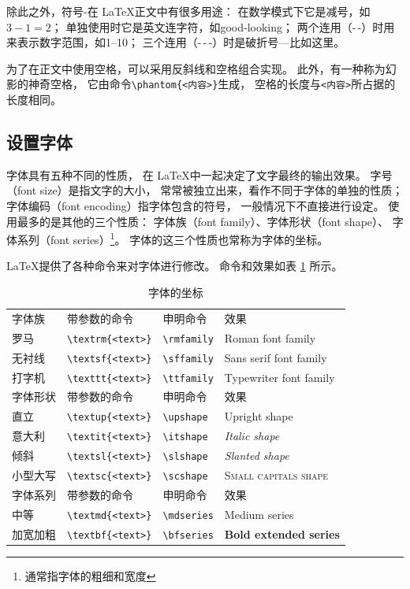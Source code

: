 \documentclass{ctexart}
\numberwithin{equation}{section}			%
\begin{document}
	除此之外，符号-在 \LaTeX 正文中有很多用途：
	在数学模式下它是减号，如$3-1=2$；
	单独使用时它是英文连字符，如good-looking；
	两个连用（-\,-）时用来表示数字范围，如1--10；
	三个连用（-\,-\,-）时是破折号---比如这里。
	
	为了在正文中使用空格，可以采用反斜线和空格组合实现。
	此外，有一种称为幻影的神奇空格，
	它由命令\verb|\phantom{<内容>}|生成，
	空格的长度与\verb|<内容>|所占据的长度相同。
	
	\subsection{设置字体}
	字体具有五种不同的性质，
	在 \LaTeX 中一起决定了文字最终的输出效果。
	字号（font size）是指文字的大小，
	常常被独立出来，看作不同于字体的单独的性质；
	字体编码（font encoding）指字体包含的符号，
	一般情况下不直接进行设定。
	使用最多的是其他的三个性质：
	字体族（font family）、字体形状（font shape）、
	字体系列（font series）\footnote{通常指字体的粗细和宽度}。
	字体的这三个性质也常称为字体的坐标。
	
	\LaTeX 提供了各种命令来对字体进行修改。
	命令和效果如表 \ref{tab:fontcoord} 所示。
	
	\begin{table}[hbp]
		\centering
		\caption{字体的坐标}
		\label{tab:fontcoord}
		\begin{tabular}{llll}
			\toprule
			字体族 & 带参数的命令 & 申明命令 & 效果 \\
			罗马 & \verb|\textrm{<text>}| & \verb|\rmfamily|
			    & \rmfamily Roman font family \\
			无衬线 & \verb|\textsf{<text>}| & \verb|\sffamily|
			    & \sffamily Sans serif font family \\
			打字机 & \verb|\texttt{<text>}| & \verb|\ttfamily|
			    & \ttfamily Typewriter font family \\
			\midrule
			字体形状 & 带参数的命令 & 申明命令 & 效果 \\
			直立 & \verb|\textup{<text>}| & \verb|\upshape|
			    & \upshape Upright shape \\
			意大利 & \verb|\textit{<text>}| & \verb|\itshape|
				& \itshape Italic shape \\
			倾斜& \verb|\textsl{<text>}| & \verb|\slshape|
				& \slshape Slanted shape \\
			小型大写 & \verb|\textsc{<text>}| & \verb|\scshape|
				& \scshape Small capitals shape \\
			\midrule
			字体系列 & 带参数的命令 & 申明命令 & 效果 \\
			中等 & \verb|\textmd{<text>}| & \verb|\mdseries|
				& \mdseries Medium series \\
			加宽加粗 & \verb|\textbf{<text>}| & \verb|\bfseries|
				& \bfseries Bold extended series \\
			\bottomrule
		\end{tabular}
	\end{table}
\end{document}
